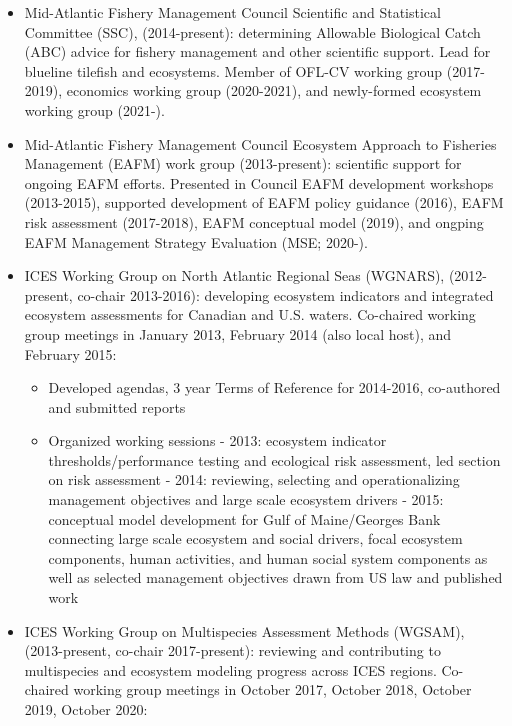 \documentclass[11pt, a4paper]{awesome-cv}
\providecommand{\tightlist}{%
	\setlength{\itemsep}{0pt}\setlength{\parskip}{0pt}}
\begin{document}
\begin{itemize}
\item
  Mid-Atlantic Fishery Management Council Scientific and Statistical
  Committee (SSC), (2014-present): determining Allowable Biological
  Catch (ABC) advice for fishery management and other scientific
  support. Lead for blueline tilefish and ecosystems. Member of OFL-CV
  working group (2017-2019), economics working group (2020-2021), and
  newly-formed ecosystem working group (2021-).
\item
  Mid-Atlantic Fishery Management Council Ecosystem Approach to
  Fisheries Management (EAFM) work group (2013-present): scientific
  support for ongoing EAFM efforts. Presented in Council EAFM
  development workshops (2013-2015), supported development of EAFM
  policy guidance (2016), EAFM risk assessment (2017-2018), EAFM
  conceptual model (2019), and ongping EAFM Management Strategy
  Evaluation (MSE; 2020-).
\item
  ICES Working Group on North Atlantic Regional Seas (WGNARS),
  (2012-present, co-chair 2013-2016): developing ecosystem indicators
  and integrated ecosystem assessments for Canadian and U.S. waters.
  Co-chaired working group meetings in January 2013, February 2014 (also
  local host), and February 2015:

  \begin{itemize}
  \tightlist
  \item
    Developed agendas, 3 year Terms of Reference for 2014-2016,
    co-authored and submitted reports
  \item
    Organized working sessions - 2013: ecosystem indicator
    thresholds/performance testing and ecological risk assessment, led
    section on risk assessment - 2014: reviewing, selecting and
    operationalizing management objectives and large scale ecosystem
    drivers - 2015: conceptual model development for Gulf of
    Maine/Georges Bank connecting large scale ecosystem and social
    drivers, focal ecosystem components, human activities, and human
    social system components as well as selected management objectives
    drawn from US law and published work
  \end{itemize}
\item
  ICES Working Group on Multispecies Assessment Methods (WGSAM),
  (2013-present, co-chair 2017-present): reviewing and contributing to
  multispecies and ecosystem modeling progress across ICES regions.
  Co-chaired working group meetings in October 2017, October 2018,
  October 2019, October 2020:


\end{itemize}
\end{document}
